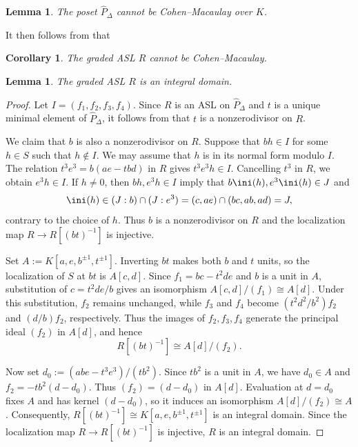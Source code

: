 \documentclass[12pt]{amsart}
\newtheorem{Lemma}[Theorem]{Lemma}
\newtheorem{Corollary}[Theorem]{Corollary}
\begin{document}
\begin{Lemma}
    \label{complex}
The poset ${\hat P}_\Delta$ cannot be Cohen--Macaulay over $K$.  
\end{Lemma}

It then follows from \cite{CV} that

\begin{Corollary}
\label{CM}
The graded ASL $R$ cannot be Cohen--Macaulay.
\end{Corollary}


\begin{Lemma}
    \label{domain}
The graded ASL $R$ is an integral domain.
\end{Lemma}


    \begin{proof}
Let $I=(f_1,f_2,f_3,f_4)$.  Since $R$ is an ASL on ${\hat P}_\Delta$ and $t$ is a unique minimal element of ${\hat P}_\Delta$, it follows from \cite[Corollary 3.6]{Eis} that $t$ is a nonzerodivisor on $R$.  


We claim that $b$ is also a nonzerodivisor on $R$. Suppose that
$bh\in I$ for some $h \in S$ such that $h \notin I$. We may assume that $h$ is in its normal form modulo $I$.
The relation $t^3e^3=b(ae-tbd)$ in $R$ gives $t^3e^3h\in I$.
Cancelling $t^3$ in $R$, we obtain $e^3h\in I$. If $h\ne0$,
then $bh,e^3h\in I$ imply that $b \ini (h),e^3 \ini (h)\in J$ and 
\[
  \ini (h)\in (J:b)\cap(J:e^3)
  =(c,ae)\cap(bc,ab,ad)=J,
\]
contrary to the choice of $h$. Thus $b$ is a nonzerodivisor on $R$
and the localization map $R\longrightarrow R[(bt)^{-1}]$ is injective.

Set $A:=K[a,e,b^{\pm1},t^{\pm1}]$. Inverting $bt$ makes both $b$
and $t$ units, so the localization of $S$ at $bt$ is $A[c,d]$.
Since $f_1=bc-t^2de$ and $b$ is a unit in $A$, substitution of
$c=t^2de/b$ gives an isomorphism $A[c,d]/(f_1)\cong A[d]$.
Under this substitution, $f_2$ remains unchanged, while $f_3$ and
$f_4$ become $(t^2d^2/b^2)f_2$ and $(d/b)f_2$, respectively.
Thus the images of $f_2,f_3,f_4$ generate the principal ideal $(f_2)$
in $A[d]$, and hence
$$
R[(bt)^{-1}]\cong A[d]/(f_2).
$$

Now set $d_0:=(abe-t^3e^3)/(tb^2)$. Since $tb^2$ is a unit in $A$,
we have $d_0\in A$ and $f_2=-tb^2(d-d_0)$. Thus $(f_2)=(d-d_0)$
in $A[d]$. Evaluation at $d=d_0$ fixes $A$ and has kernel $(d-d_0)$,
so it induces an isomorphism $A[d]/(f_2)\cong A$. Consequently,
$R[(bt)^{-1}]\cong K[a,e,b^{\pm1},t^{\pm1}]$ is an integral domain.
Since the localization map $R\longrightarrow R[(bt)^{-1}]$ is
injective, $R$ is an integral domain.
\hspace{5.3cm}
\end{proof}
\end{document}
